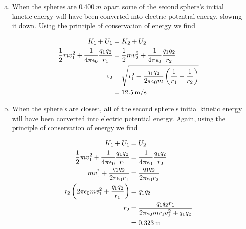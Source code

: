 \documentclass{article}
\begin{document}
\begin{enumerate}[a)]
  \item When the spheres are $\qty{0.400}{m}$ apart some of the second sphere's initial kinetic energy will have been converted into electric potential energy, slowing it down. Using the principle of conservation of energy we find

        \begin{align*}
          K_1 + U_1                                     & = K_2 + U_2                                                                                      \\
          \frac{1}{2} m v_1^2 + \frac{1}{4 \pi \epsilon_0} \frac{q_1 q_2}{r_1} & = \frac{1}{2} m v_2^2 + \frac{1}{4 \pi \epsilon_0} \frac{q_1 q_2}{r_2}                                                  \\
          v_2                                           & = \sqrt{v_1^2 + \frac{q_1 q_2}{2 \pi \epsilon_0 m} \left( \frac{1}{r_1} - \frac{1}{r_2} \right)} \\
                                                        & = \qty{12.5}{m/s}
        \end{align*}

  \item When the sphere's are closest, all of the second sphere's initial kinetic energy will have been converted into electric potential energy. Again, using the principle of conservation of energy we find

        \begin{align*}
          K_1 + U_1                                                         & = U_2                                                        \\
          \frac{1}{2} m v_1^2 + \frac{1}{4 \pi \epsilon_0} \frac{q_1 q_2}{r_1}                     & = \frac{1}{4 \pi \epsilon_0} \frac{q_1 q_2}{r_2}                                    \\
          m v_1^2 + \frac{q_1 q_2}{2 \pi \epsilon_0 r_1}                    & = \frac{q_1 q_2}{2 \pi \epsilon_0 r_2}                       \\
          r_2 \left( 2 \pi \epsilon_0 m v_1^2 + \frac{q_1 q_2}{r_1} \right) & = q_1 q_2                                                    \\
          r_2                                                               & = \frac{q_1 q_2 r_1}{2 \pi \epsilon_0 m r_1 v_1^2 + q_1 q_2} \\
                                                                            & = \qty{0.323}{m}
        \end{align*}
\end{enumerate}
\end{document}
